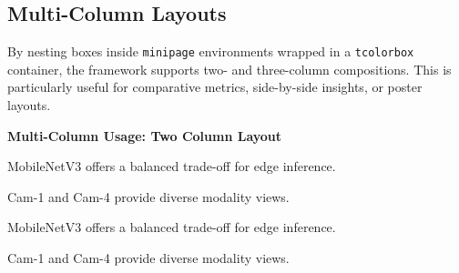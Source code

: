 \documentclass[12pt,onecolumn]{article}
\begin{document}
  \subsection{Multi-Column Layouts}
  \label{sec:structural-multicol}
    By nesting boxes inside \texttt{minipage} environments wrapped in a \texttt{tcolorbox} container, the framework supports two- and three-column compositions. This is particularly useful for comparative metrics, side-by-side insights, or poster layouts.

    \textbf{Multi-Column Usage: Two Column Layout}
    \begin{tcolorbox}[enhanced, sharp corners=south, colframe=white, colback=white, boxrule=0pt, top=0pt, bottom=0pt, left=0pt, right=0pt]
      \begin{minipage}[t]{0.48\textwidth}
        \begin{ktbox}[title=Model Insight]
          MobileNetV3 offers a balanced trade-off for edge inference.
        \end{ktbox}
      \end{minipage}\hfill
      \begin{minipage}[t]{0.48\textwidth}
        \begin{ktbox}[theme=green, title=Camera Insight]
          Cam-1 and Cam-4 provide diverse modality views.
        \end{ktbox}
      \end{minipage}
    \end{tcolorbox}

    \begin{ktbox}[theme=gray]
      \begin{codeblock}
\begin{tcolorbox}[enhanced, sharp corners=south, colframe=white, colback=white, boxrule=0pt, top=0pt, bottom=0pt, left=0pt, right=0pt]
  \begin{minipage}[t]{0.48\textwidth}
    \begin{ktbox}[title=Model Insight]
      MobileNetV3 offers a balanced trade-off for edge inference.
    \end{ktbox}
  \end{minipage}\hfill
  \begin{minipage}[t]{0.48\textwidth}
    \begin{ktbox}[theme=green, title=Camera Insight]
      Cam-1 and Cam-4 provide diverse modality views.
    \end{ktbox}
  \end{minipage}
\end{tcolorbox}
      \end{codeblock}
    \end{ktbox}
\end{document}
